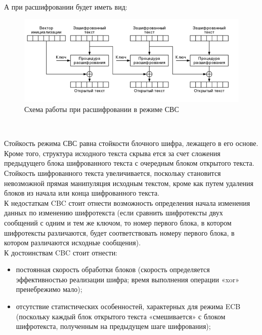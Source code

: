 \documentclass[oneside,final,14pt]{extreport}
\begin{document}
~\



А при расшифровании будет иметь вид:\\

\begin{figure}[h!]
\includegraphics[width=1\textwidth]{8.png}
\caption{Схема работы при расшифровании в режиме СВС}

\end{figure}





~\


Стойкость режима СВС равна стойкости блочного шифра, лежа­щего в его основе. Кроме того, структура исходного текста скрыва­
ется за счет сложения предыдущего блока шифрованного текста с
очередным блоком открытого текста. Стойкость шифрованного
текста увеличивается, поскольку становится невозможной прямая
манипуляция исходным текстом, кроме как путем удаления блоков из
начала или конца шифрованного текста.\\



К недостаткам CBC стоит отнести возможность определения начала изменения данных по изменению шифротекста (если сравнить шифротексты двух сообщений с одним и тем же ключом, то номер первого блока, в котором шифротексты различаются, будет соответствовать номеру первого блока, в котором различаются исходные сообщения).\\


К достоинствам CBC стоит отнести:

\begin{itemize}
\item постоянная скорость обработки блоков (скорость определяется эффективностью реализации шифра; время выполнения операции «xor» пренебрежимо мало);

\item отсутствие статистических особенностей, характерных для режима ECB (поскольку каждый блок открытого текста «смешивается» с блоком шифротекста, полученным на предыдущем шаге шифрования);
\end{itemize}
\end{document}
